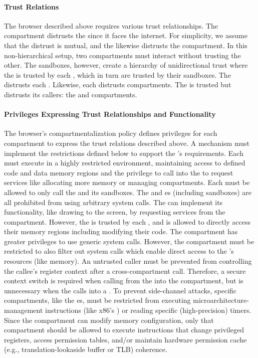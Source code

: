 \paragraph{Trust Relations} 
The browser described above requires various trust relationships.
The \local compartment distrusts the \renderer since it faces the
internet.
For simplicity, we assume that the distrust is mutual, and the \renderer
likewise distrusts the \local compartment.
In this non-hierarchical setup, two compartments must interact without
trusting the other.
The sandboxes, however, create a hierarchy of unidirectional trust where 
the \renderer is trusted by each \sandbox, which in turn are trusted
by their \nested sandboxes.
The \renderer distrusts each \sandbox.
Likewise, each \sandbox distrusts \nested compartments.
The \manager is trusted but distrusts its callers: the \renderer
and \local compartments.

\paragraph{Privileges Expressing Trust Relationships and Functionality}
The browser's compartmentalization policy defines privileges for each
compartment to express the trust relations described above.
A mechanism must implement the restrictions defined below to support
the \browser's requirements.
Each \sandbox must execute in a highly restricted environment, 
maintaining access to defined code and data memory regions and the 
privilege to call into the \renderer to request services like
allocating more memory or managing \nested compartments.
Each \sandbox must be allowed to only call the \renderer and its
\nested sandboxes.
The \renderer and \sandbox{}es (including \nested sandboxes) are all prohibited
from using arbitrary system calls.
The \renderer can implement its functionality, like drawing to the screen,
by requesting services from the \local compartment.
However, the \renderer is trusted by each \sandbox, and is allowed to 
directly access their memory regions including modifying their code.
The \local compartment has greater privileges to use generic system calls.
However, the \local compartment must be restricted to also filter out 
system calls which enable direct access to the 
\renderer{}'s resources (like memory).
An untrusted caller must be prevented from controlling the callee's register
context after a cross-compartment call.
Therefore, a secure context switch is required when calling from the \renderer
into the \local compartment, but is unnecessary when the \renderer calls into a
\sandbox.
To prevent side-channel attacks, specific compartments, like the \sandbox{}es,
must be restricted from executing
microarchitecture-management instructions (like x86's ) or
reading specific (high-precision) timers.
Since the \manager compartment can modify memory configuration, 
only that compartment should be allowed to execute instructions that change 
privileged registers, access permission tables, and/or maintain hardware 
permission cache (e.g., translation-lookaside buffer or TLB) coherence.

